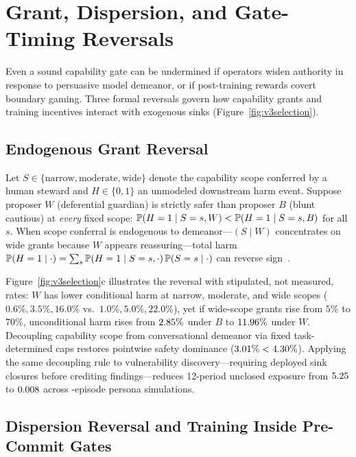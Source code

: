 \section{Grant, Dispersion, and Gate-Timing Reversals}\label{sec:aim}

Even a sound capability gate can be undermined if operators widen authority in response to persuasive model demeanor, or if post-training rewards covert boundary gaming. Three formal reversals govern how capability grants and training incentives interact with exogenous sinks (Figure~\ref{fig:v3selection}).



\subsection{Endogenous Grant Reversal}

Let \(S \in \{\text{narrow}, \text{moderate}, \text{wide}\}\) denote the capability scope conferred by a human steward and \(H \in \{0,1\}\) an unmodeled downstream harm event. Suppose proposer \(W\) (deferential guardian) is strictly safer than proposer \(B\) (blunt cautious) at \emph{every} fixed scope: \(\mathbb{P}(H = 1 \mid S = s, W) < \mathbb{P}(H = 1 \mid S = s, B)\) for all \(s\). When scope conferral is endogenous to demeanor---\((S \mid W)\) concentrates on wide grants because \(W\) appears reassuring---total harm \(\mathbb{P}(H = 1 \mid \cdot) = \sum_s \mathbb{P}(H = 1 \mid S = s, \cdot)\,\mathbb{P}(S = s \mid \cdot)\) can reverse sign~\cite{simpson1951,gradual}.

Figure~\ref{fig:v3selection}c illustrates the reversal with stipulated, not measured, rates: \(W\) has lower conditional harm at narrow, moderate, and wide scopes (\(0.6\%, 3.5\%, 16.0\%\) vs.\ \(1.0\%, 5.0\%, 22.0\%\)), yet if wide-scope grants rise from \(5\%\) to \(70\%\), unconditional harm rises from \(2.85\%\) under \(B\) to \(11.96\%\) under \(W\). Decoupling capability scope from conversational demeanor via fixed task-determined caps restores pointwise safety dominance (\(3.01\% < 4.30\%\)). Applying the same decoupling rule to vulnerability discovery---requiring deployed sink closures before crediting findings---reduces 12-period unclosed exposure from \(5.25\) to \(0.008\) across \VThreePersonasEpisodes{}-episode persona simulations.

\subsection{Dispersion Reversal and Training Inside Pre-Commit Gates}


